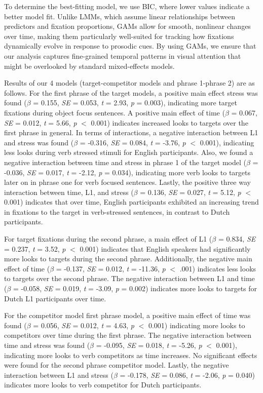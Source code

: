 To determine the best-fitting model, we use BIC, where lower values indicate a better model fit. Unlike LMMs, which assume linear relationships between predictors and fixation proportions, GAMs allow for smooth, nonlinear changes over time, making them particularly well-suited for tracking how fixations dynamically evolve in response to prosodic cues. By using GAMs, we ensure that our analysis captures fine-grained temporal patterns in visual attention that might be overlooked by standard mixed-effects models.

Results of our 4 models (target-competitor models and phrase 1-phrase 2) are as follows. For the first phrase of the target models, a positive main effect stress was found ($\beta$ = 0.155, \textit{SE} = 0.053, \textit{t} = 2.93, \textit{p} = 0.003), indicating more target fixations during object focus sentences. A positive main effect of time ($\beta$ = 0.067, \textit{SE} = 0.012, \textit{t} = 5.66, \textit{p} $<$ 0.001)
 indicates increased looks to targets over the first phrase in general. In terms of interactions, a negative interaction between L1 and stress was found ($\beta$ = -0.316, \textit{SE} = 0.084, \textit{t} = -3.76, \textit{p} $<$ 0.001), indicating less looks during verb stressed stimuli for English participants. Also, we found a negative interaction between time and stress in phrase 1 of the target model ($\beta$ = -0.036, \textit{SE} = 0.017, \textit{t} = -2.12, \textit{p} = 0.034), indicating more verb looks to targets later on in phrase one for verb focused sentences. Lastly, the positive three way interaction between time, L1, and stress ($\beta$ = 0.136, \textit{SE} = 0.027, \textit{t} = 5.12, \textit{p} $<$ 0.001) indicates that over time, English participants exhibited an increasing trend in fixations to the target in verb-stressed sentences, in contrast to Dutch participants.
 
 For target fixations during the second phrase, a main effect of L1 ($\beta$ = 0.834, \textit{SE} = 0.237, \textit{t} = 3.52, \textit{p} $<$ 0.001) indicates that English speakers had significantly more looks to targets during the second phrase. Additionally, the negative main effect of time ($\beta$ = -0.137, \textit{SE} = 0.012, \textit{t} = -11.36, \textit{p} $<$ .001) indicates less looks to targets over the second phrase. The negative interaction between L1 and time ($\beta$ = -0.058, \textit{SE} = 0.019, \textit{t} = -3.09, \textit{p} = 0.002) indicates more looks to targets for Dutch L1 participants over time.

For the competitor model first phrase model, a positive main effect of time was found ($\beta$ = 0.056, \textit{SE} = 0.012, \textit{t} = 4.63, \textit{p} $<$ 0.001) indicating more looks to competitors over time during the first phrase. The negative interaction between time and stress was found ($\beta$ = -0.095, \textit{SE} = 0.018, \textit{t} = -5.26, \textit{p} $<$ 0.001), indicating more looks to verb competitors as time increases. No significant effects were found for the second phrase competitor model. Lastly, the negative interaction between L1 and stress ($\beta$ = -0.178, \textit{SE} = 0.086, \textit{t} = -2.06, \textit{p} = 0.040) indicates more looks to verb competitor for Dutch participants.

